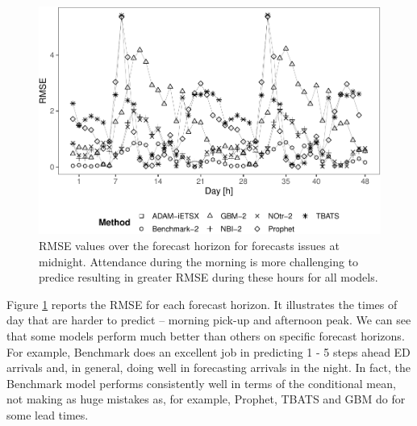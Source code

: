 \documentclass[]{elsarticle} %
\begin{document}
\begin{figure}[H]

{\centering \includegraphics[width=0.7\linewidth]{paper_files/figure-latex/lead-time-rmse-1} 

}

\caption{RMSE values over the forecast horizon for forecasts issues at midnight. Attendance during the morning is more challenging to predice resulting in greater RMSE during these hours for all models.}\label{fig:lead-time-rmse}
\end{figure}

Figure \ref{fig:lead-time-rmse} reports the RMSE for each forecast horizon. It illustrates the times of day that are harder to predict -- morning pick-up and afternoon peak. We can see that some models perform much better than others on specific forecast horizons. For example, Benchmark does an excellent job in predicting 1 - 5 steps ahead ED arrivals and, in general, doing well in forecasting arrivals in the night. In fact, the Benchmark model performs consistently well in terms of the conditional mean, not making as huge mistakes as, for example, Prophet, TBATS and GBM do for some lead times.
\end{document}
